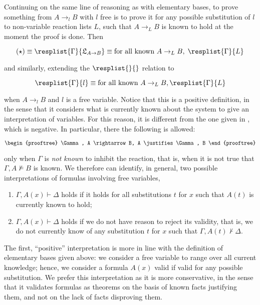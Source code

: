 Continuing on the same line of reasoning as with elementary bases, to prove
something from $A \rightarrow_l B$ with $l$ free is to prove it for any
possible substitution of $l$ to non-variable
reaction lists $L$, such that
$A \rightarrow_{L} B$ is known to hold at the moment the
proof is done.
Then

\[
  (\star) \equiv
  \resplist{\Gamma}{\mathfrak{L}_{A \rightarrow B}} \equiv
  \text{for all known } A \rightarrow_{L} B,
  \; \resplist{\Gamma}{L}
\]

and similarly, extending the $\resplist{}{}$ relation to

\[
  \resplist{\Gamma}{l} \equiv
  \text{for all known } A \rightarrow_{L} B,
  \resplist{\Gamma}{L}
\]

when $A \rightarrow_l B$ and $l$ is a free variable. Notice that this is a
positive definition, in the sense that it considers what is currently known
about the system to give an interpretation of variables.
For this reason, it is different from the one given in \cite{adding-logic},
which is negative. In particular, there the following is allowed:

\[
  \begin{prooftree}
    \Gamma, A \rightarrow B, A
    \justifies
    \Gamma, B
  \end{prooftree}
\]

only when $\Gamma$ is \emph{not known} to inhibit the reaction, that is, when it
is not true that $\Gamma, A \not \models B$ is known. We therefore can
identify, in general, two possible interpretations of formulas involving free
variables,

\begin{enumerate}
\item $\Gamma, A(x) \vdash \Delta$ holds if it holds for all substitutions $t$
  for $x$ such that $A(t)$ is currently known to hold;
\item $\Gamma, A(x) \vdash \Delta$ holds if we do not have reason to reject its
  validity, that is, we do not currently know of any substitution $t$ for $x$
  such that $\Gamma, A(t) \not \vdash \Delta$.
\end{enumerate}

The first, ``positive'' interpretation is more in line with the definition of
elementary bases given above: we consider a free variable to range over all
current knowledge; hence, we consider a formula $A(x)$ valid if valid for any
possible substitution. We prefer this interpretation as it is more conservative,
in the sense that it validates formulas as theorems on the basis of known facts
justifying them, and not on the lack of facts disproving them.

